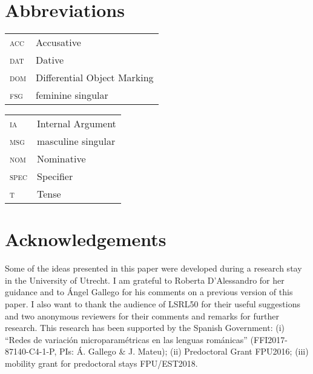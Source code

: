 \documentclass[output=paper,colorlinks,citecolor=brown]{langscibook}
\begin{document}
\section*{Abbreviations}
\begin{tabularx}{.45\textwidth}{lQ}
\textsc{acc} & Accusative \\
\textsc{dat} & Dative \\
\textsc{dom} & Differential Object Marking \\
\textsc{fsg} & feminine singular \\
\end{tabularx}
\begin{tabularx}{.45\textwidth}{lQ}
\textsc{ia} & Internal Argument \\
\textsc{msg} & masculine singular \\
\textsc{nom} & Nominative \\
\textsc{spec} & Specifier \\
\textsc{t} & Tense \\
\end{tabularx}


\section*{Acknowledgements}
Some of the ideas presented in this paper were developed during a research stay in the University of Utrecht. I am grateful to Roberta D'Alessandro for her guidance and to Ángel Gallego for his comments on a previous version of this paper. I also want to thank the audience of LSRL50 for their useful suggestions and two anonymous reviewers for their comments and remarks for further research. This research has been supported by the Spanish Government: (i) “Redes de variación microparamétricas en las lenguas románicas” (FFI2017-87140-C4-1-P, PIs: Á. Gallego \& J. Mateu); (ii) Predoctoral Grant FPU2016; (iii) mobility grant for predoctoral stays FPU/EST2018.

\printbibliography[heading=subbibliography,notkeyword=this]
\end{document}
